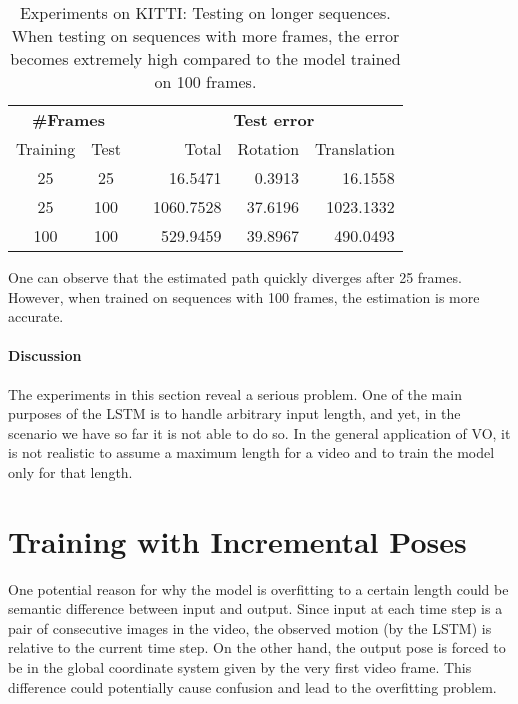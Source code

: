 		\begin{table}[tb]
			\small
			\begin{center}
				\begin{tabular}{cccrrr}
					\toprule
					\multicolumn{2}{c}{\textbf{\#Frames}}	&	& \multicolumn{3}{c}{\textbf{Test error}} \\ 
					\cmidrule(lr){1-2} 									\cmidrule(lr){4-6}
					Training 		& Test 			&	& Total 	& Rotation	& Translation	\\ 
					\midrule
					25				& 25			&	& 16.5471	& 0.3913	& 16.1558		\\
					25				& 100			&	& 1060.7528	& 37.6196	& 1023.1332		\\
					100				& 100			&	& 529.9459	& 39.8967	& 490.0493		\\ 
					\bottomrule
				\end{tabular}
			\end{center}
			\caption[Experiments on KITTI: Testing on longer sequences]
					{Experiments on KITTI: Testing on longer sequences. 
					 When testing on sequences with more frames, the error becomes extremely high compared to the model trained on 100 frames.
					 \label{tbl:kitti-testing-on-longer-sequences}}
		\end{table}
		One can observe that the estimated path quickly diverges after 25 frames.
		However, when trained on sequences with 100 frames, the estimation is more accurate.
		
		\paragraph{Discussion}
		The experiments in this section reveal a serious problem.
		One of the main purposes of the LSTM is to handle arbitrary input length, and yet, in the scenario we have so far it is not able to do so.
		In the general application of VO, it is not realistic to assume a maximum length for a video and to train the model only for that length.
		
		
	\section{Training with Incremental Poses}
		One potential reason for why the model is overfitting to a certain length could be semantic difference between input and output.
		Since input at each time step is a pair of consecutive images in the video, the observed motion (by the LSTM) is relative to the current time step.
		On the other hand, the output pose is forced to be in the global coordinate system given by the very first video frame.
		This difference could potentially cause confusion and lead to the overfitting problem.
		
